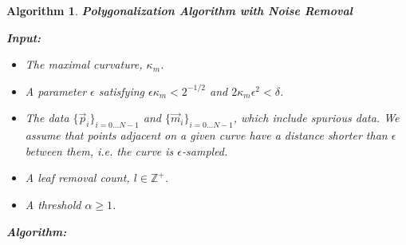 \documentclass{article}
\newtheorem{algo}{Algorithm}
\numberwithin{cntr}{section}
\numberwithin{equation}{section}
\newcommand{\vp}[0]{{\vec{p}}}
\newcommand{\vm}[0]{{\vec{m}}}
\newcommand{\OtoN}{{0 \ldots N-1}}
\newcommand{\pointData}{{ \{ \vp_{i} \}_{i=\OtoN} }}
\newcommand{\tanData}{{ \{ \vm_{i} \}_{i=\OtoN} }}
\newcommand{\curvemax}{{\kappa_{m}}}
\newcommand{\curvesep}{{\delta}}
\begin{document}
\begin{algo}
  \label{algo:noisyPolygonalization}
  {\bf Polygonalization Algorithm with Noise Removal }

  { \bf Input: }

  \begin{itemize}
  \item The maximal curvature, $\curvemax$.
  \item A parameter $\epsilon$ satisfying $\epsilon \curvemax < 2^{-1/2}$ and $2 \curvemax \epsilon^{2} < \curvesep$.
  \item The data $\pointData$ and $\tanData$, which include spurious data. We assume that points adjacent on a given curve have a distance shorter than $\epsilon$ between them, i.e. the curve is $\epsilon$-sampled.
  \item A leaf removal count, $l \in \mathbb{Z}^{+}$.
  \item A threshold $\alpha \geq 1$.
  \end{itemize}


  {\bf Algorithm: }


\end{algo}
\end{document}
